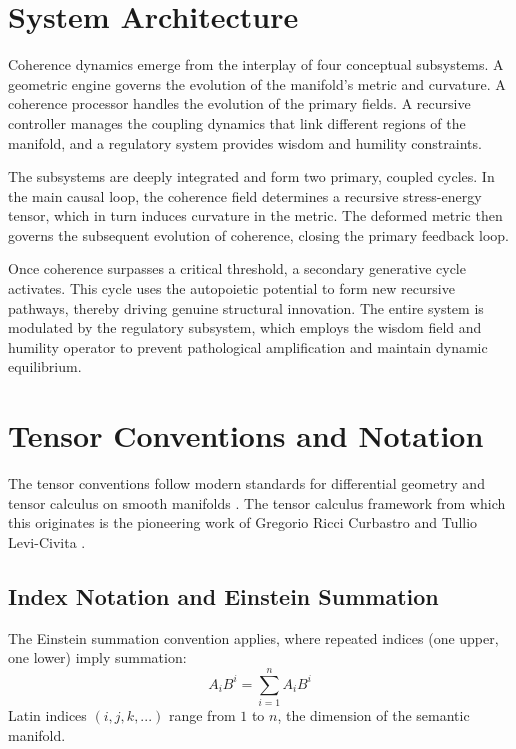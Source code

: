 \section{System Architecture}

Coherence dynamics emerge from the interplay of four conceptual subsystems. A geometric engine governs the evolution of the manifold's metric and curvature. A coherence processor handles the evolution of the primary fields. A recursive controller manages the coupling dynamics that link different regions of the manifold, and a regulatory system provides wisdom and humility constraints.

The subsystems are deeply integrated and form two primary, coupled cycles. In the main causal loop, the coherence field determines a recursive stress-energy tensor, which in turn induces curvature in the metric. The deformed metric then governs the subsequent evolution of coherence, closing the primary feedback loop. 

Once coherence surpasses a critical threshold, a secondary generative cycle activates. This cycle uses the autopoietic potential to form new recursive pathways, thereby driving genuine structural innovation. The entire system is modulated by the regulatory subsystem, which employs the wisdom field and humility operator to prevent pathological amplification and maintain dynamic equilibrium.

\section{Tensor Conventions and Notation}

The tensor conventions follow modern standards for differential geometry and tensor calculus on smooth manifolds \autocite{Lee2003, MisnerThorneWheeler1973}. The tensor calculus framework from which this originates is the pioneering work of Gregorio Ricci Curbastro and Tullio Levi-Civita \autocite{RicciLeviCivita1901}.

\subsection{Index Notation and Einstein Summation}

The Einstein summation convention \autocite{Einstein1916} applies, where repeated indices (one upper, one lower) imply summation:
\begin{equation}
A_i B^i = \sum_{i=1}^n A_i B^i
\end{equation}
Latin indices \((i,j,k,...)\) range from \(1\) to \(n\), the dimension of the semantic manifold.

